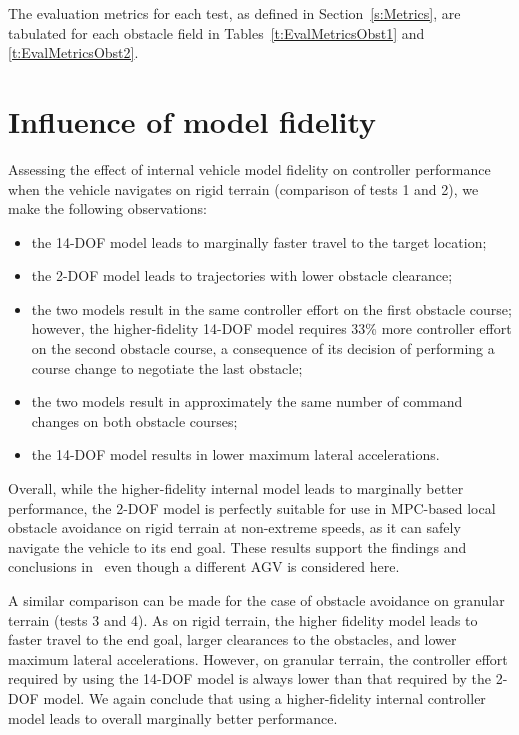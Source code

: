 \documentclass[12pt,onecolumn]{report}
\begin{document}
The evaluation metrics for each test, as defined in Section~\ref{s:Metrics}, are tabulated for each obstacle field in Tables~\ref{t:EvalMetricsObst1} and \ref{t:EvalMetricsObst2}. 

\section{Influence of model fidelity}

Assessing the effect of internal vehicle model fidelity on controller performance when the vehicle navigates on rigid terrain (comparison of tests 1 and 2), we make the following observations:
\begin{itemize}
\item the 14-DOF model leads to marginally faster travel to the target location;
\item the 2-DOF model leads to trajectories with lower obstacle clearance;
\item the two models result in the same controller effort on the first obstacle course; however, the higher-fidelity 14-DOF model requires 33\% more controller effort on the second obstacle course, a consequence of its decision of performing a course change to negotiate the last obstacle;
\item the two models result in approximately the same number of command changes on both obstacle courses;
\item the 14-DOF model results in lower maximum lateral accelerations.
\end{itemize}


Overall, while the higher-fidelity internal model leads to marginally better performance, the 2-DOF model is perfectly suitable for use in MPC-based local obstacle avoidance on rigid terrain at non-extreme speeds, as it can safely navigate the vehicle to its end goal. These results support the findings and conclusions in~\cite{ModelFidelity2016} even though a different AGV is considered here.

A similar comparison can be made for the case of obstacle avoidance on granular terrain (tests 3 and 4).  As on rigid terrain, the higher fidelity model leads to faster travel to the end goal, larger clearances to the obstacles, and lower maximum lateral accelerations.  However, on granular terrain, the controller effort required by using the 14-DOF model is always lower than that required by the 2-DOF model.  We again conclude that using a higher-fidelity internal controller model leads to overall marginally better performance.
\end{document}
